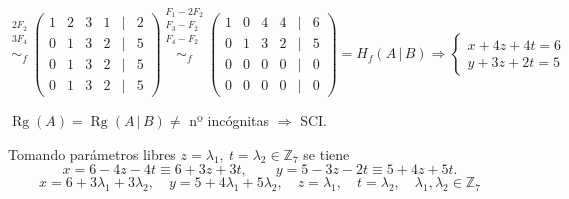 \documentclass[a4paper,12pt]{article}
\begin{document}
\begin{ejercicio}[title=Ejercicio 26]
\[
\overset{\substack{2F_2 \\ 3F_4 \\ {}}}{\sim_f}
\begin{pmatrix}
1 & 2 & 3 & 1 &\Big|& 2\\
0 & 1 & 3 & 2 &\Big|& 5\\
0 & 1 & 3 & 2 &\Big|& 5\\
0 & 1 & 3 & 2 &\Big|& 5
\end{pmatrix}
\overset{\substack{F_1 - 2F_2 \\ F_3 - F_2 \\ F_4 - F_2 \\{}}}{\sim_f}
\begin{pmatrix}
1 & 0 & 4 & 4 &\Big|& 6\\
0 & 1 & 3 & 2 &\Big|& 5\\
0 & 0 & 0 & 0 &\Big|& 0\\
0 & 0 & 0 & 0 &\Big|& 0
\end{pmatrix}
= H_f(A\,|\,B)
\Rightarrow
\begin{cases}
x + 4z + 4t = 6\\[4pt]
y + 3z + 2t = 5
\end{cases}
\]

$\operatorname{Rg}(A) = \operatorname{Rg}(A\,|\,B) \ne $ nº incógnitas $ \Rightarrow$ SCI.

\vspace{0.5em}

Tomando parámetros libres \(z=\lambda_1,\ t=\lambda_2\in\mathbb{Z}_7\) se tiene
\[
x = 6 - 4z - 4t \equiv 6 + 3z + 3t,
\qquad
y = 5 - 3z - 2t \equiv 5 + 4z + 5t.
\]
\[
\boxed{\,x = 6+3\lambda_1+3\lambda_2,\quad y = 5+4\lambda_1+5\lambda_2,\quad z=\lambda_1,\quad t=\lambda_2,\quad
\lambda_1,\lambda_2\in\mathbb{Z}_7\,}
\]
\end{ejercicio}
\end{document}
